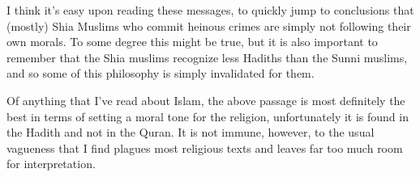 \documentclass[12pt,letterpaper]{article}
\begin{document}
\begin{spacing}{2}
    I think it's easy upon reading these messages, to quickly jump to
    conclusions that (mostly) Shia Muslims who commit heinous crimes are simply
    not following their own morals. To some degree this might be true, but it is
    also important to remember that the Shia muslims recognize less Hadiths than
    the Sunni muslims, and so some of this philosophy is simply invalidated for
    them.

    Of anything that I've read about Islam, the above passage is most definitely
    the best in terms of setting a moral tone for the religion, unfortunately it
    is found in the Hadith and not in the Quran. It is not immune, however, to
    the usual vagueness that I find plagues most religious texts and leaves far
    too much room for interpretation.

\end{spacing}
\end{document}
